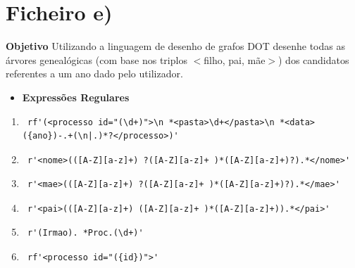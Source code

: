 \documentclass[11pt,a4paper]{report}
\begin{document}
\vspace{1cm}

	\section*{Ficheiro e)}

	\textbf{Objetivo} Utilizando a linguagem de desenho de grafos DOT desenhe todas as árvores genealógicas (com
	base nos triplos $<$filho, pai, mãe$>$) dos candidatos referentes a um ano dado pelo utilizador.\par
	
	\begin{itemize}
	\item \textbf{Expressões Regulares}
	\end{itemize}
	

	\begin{enumerate}
	\item  \begin{verbatim} rf'(<processo id="(\d+)">\n *<pasta>\d+</pasta>\n *<data>({ano})-.+(\n|.)*?</processo>)'  \end{verbatim} 
	\item  \begin{verbatim} r'<nome>(([A-Z][a-z]+) ?([A-Z][a-z]+ )*([A-Z][a-z]+)?).*</nome>'  \end{verbatim} 
	\item  \begin{verbatim} r'<mae>(([A-Z][a-z]+) ?([A-Z][a-z]+ )*([A-Z][a-z]+)?).*</mae>'  \end{verbatim} 
	\item  \begin{verbatim} r'<pai>(([A-Z][a-z]+) ([A-Z][a-z]+ )*([A-Z][a-z]+)).*</pai>'  \end{verbatim} 
	\item  \begin{verbatim} r'(Irmao). *Proc.(\d+)'  \end{verbatim} 
	\item  \begin{verbatim} rf'<processo id="({id})">'  \end{verbatim} 
\end{enumerate}
\end{document}
